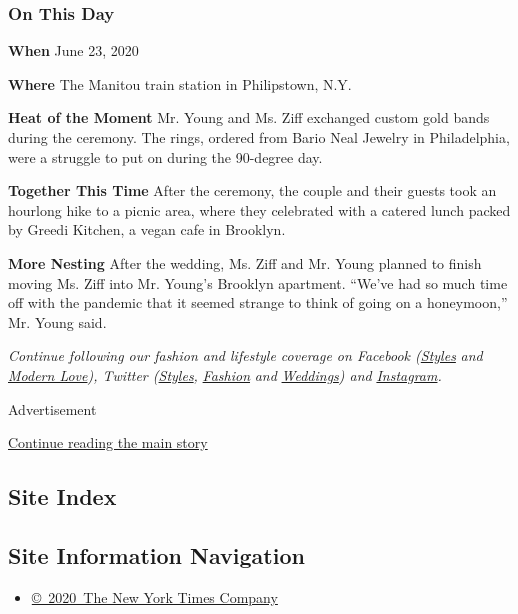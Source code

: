 \hypertarget{on-this-day}{%
\subsubsection{On This Day}\label{on-this-day}}

\textbf{When} June 23, 2020

\textbf{Where} The Manitou train station in Philipstown, N.Y.

\textbf{Heat of the Moment} Mr. Young and Ms. Ziff exchanged custom gold
bands during the ceremony. The rings, ordered from Bario Neal Jewelry in
Philadelphia, were a struggle to put on during the 90-degree day.

\textbf{Together This Time} After the ceremony, the couple and their
guests took an hourlong hike to a picnic area, where they celebrated
with a catered lunch packed by Greedi Kitchen, a vegan cafe in Brooklyn.

\textbf{More Nesting} After the wedding, Ms. Ziff and Mr. Young planned
to finish moving Ms. Ziff into Mr. Young's Brooklyn apartment. ``We've
had so much time off with the pandemic that it seemed strange to think
of going on a honeymoon,'' Mr. Young said.

\emph{Continue following our fashion and lifestyle coverage on Facebook
(}\href{https://www.facebookcorewwwi.onion/nytimesstyles}{\emph{Styles}}
\emph{and}
\href{https://www.facebookcorewwwi.onion/modernlove}{\emph{Modern
Love}}\emph{), Twitter
(}\href{https://twitter.com/nytstyles}{\emph{Styles}}\emph{,}
\href{https://twitter.com/nytfashion}{\emph{Fashion}} \emph{and}
\href{https://twitter.com/nytimesvows}{\emph{Weddings}}\emph{) and}
\href{https://instagram.com/nytimesfashion}{\emph{Instagram}}\emph{.}

Advertisement

\protect\hyperlink{after-bottom}{Continue reading the main story}

\hypertarget{site-index}{%
\subsection{Site Index}\label{site-index}}

\hypertarget{site-information-navigation}{%
\subsection{Site Information
Navigation}\label{site-information-navigation}}

\begin{itemize}
\tightlist
\item
  \href{https://help.nytimes3xbfgragh.onion/hc/en-us/articles/115014792127-Copyright-notice}{©~2020~The
  New York Times Company}
\end{itemize}


